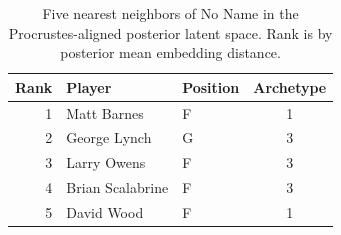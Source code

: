 \begin{table}[htbp]
  \centering\small
  \begin{tabular}{rllc}
    \toprule
    Rank & Player & Position & Archetype \\
    \midrule
    1 & Matt Barnes & F & 1 \\
    2 & George Lynch & G & 3 \\
    3 & Larry Owens & F & 3 \\
    4 & Brian Scalabrine & F & 3 \\
    5 & David Wood & F & 1 \\
    \bottomrule
  \end{tabular}
  \caption{Five nearest neighbors of No Name in the Procrustes-aligned posterior latent space. Rank is by posterior mean embedding distance.}
  \label{tab:No_Name_neighbors}
\end{table}


